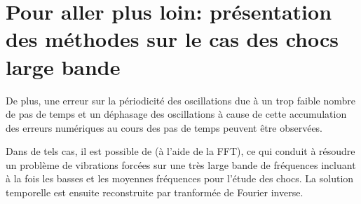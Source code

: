 









\medskip
\section{Pour aller plus loin: présentation des méthodes sur le cas des chocs large bande}


\medskip
{} 
De plus, une erreur sur la périodicité des oscillations due à un trop faible nombre de pas de temps et 
un déphasage des oscillations à cause de cette accumulation des erreurs numériques au cours des pas 
de temps peuvent être observées.

Dans de tels cas, il est possible de  
(à l'aide de la FFT),  ce qui conduit à résoudre un problème de vibrations forcées sur une très large bande 
de fréquences incluant à la fois les basses et les moyennes fréquences pour l'étude des chocs.
La solution temporelle est ensuite reconstruite par tranformée de Fourier 
inverse.

